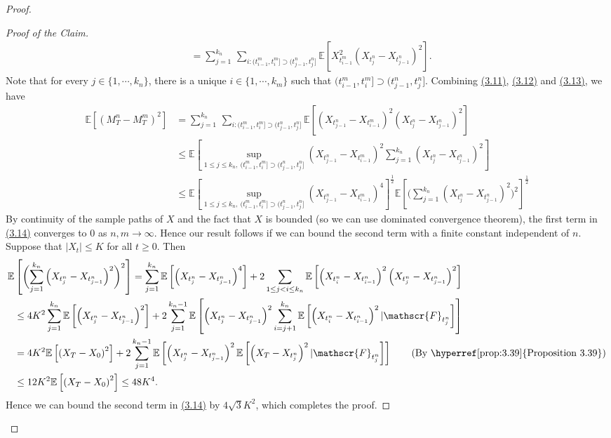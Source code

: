 \documentclass{article}
\numberwithin{equation}{section}
\newcommand{\E}{\mathbb{E}}
\theoremstyle{plain}
\theoremstyle{definition}
\begin{document}
\begin{proof}
\begin{proof}[Proof of the Claim]
\begin{align*}
	&= \sum_{j=1}^{k_n}\,\sum_{i:(t_{i-1}^m,t_i^m]\supset(t_{j-1}^n,t_j^n]}\E\left[X_{t_{i-1}^m}^2\left(X_{t_j^n}-X_{t_{j-1}^n}\right)^2\right].\tag{3.13}\label{eq:3.13}
\end{align*}
Note that for every $j\in\{1,\cdots,k_n\}$, there is a unique $i\in\{1,\cdots,k_m\}$ such that $(t_{i-1}^m,t_i^m]\supset(t_{j-1}^n,t_j^n]$. Combining \hyperref[eq:3.11]{(3.11)}, \hyperref[eq:3.12]{(3.12)} and \hyperref[eq:3.13]{(3.13)}, we have
\begin{align*}
	\E\left[(M_T^n-M_T^m)^2\right] &= \sum_{j=1}^{k_n}\,\sum_{i:(t_{i-1}^m,t_i^m]\supset(t_{j-1}^n,t_j^n]}\E\left[\left(X_{t_{j-1}^n}-X_{t_{i-1}^m}\right)^2\left(X_{t_j^n}-X_{t_{j-1}^n}\right)^2\right]\\
	&\leq \E\left[\sup_{1\leq j\leq k_n,\ (t_{i-1}^m,t_i^m]\supset(t_{j-1}^n,t_j^n]}\left(X_{t_{j-1}^n}-X_{t_{i-1}^m}\right)^2 \sum_{j=1}^{k_n}\left(X_{t_j^n}-X_{t_{j-1}^n}\right)^2\right]\\
	&\leq \E\left[\sup_{1\leq j\leq k_n,\ (t_{i-1}^m,t_i^m]\supset(t_{j-1}^n,t_j^n]}\left(X_{t_{j-1}^n}-X_{t_{i-1}^m}\right)^4\right]^{\frac{1}{2}} \E\left[\biggl(\sum_{j=1}^{k_n}\left(X_{t_j^n}-X_{t_{j-1}^n}\right)^2\biggr)^2\right]^{\frac{1}{2}}\tag{3.14}\label{eq:3.14}
\end{align*}
By continuity of the sample paths of $X$ and the fact that $X$ is bounded (so we can use dominated convergence theorem), the first term in \hyperref[eq:3.14]{(3.14)} converges to $0$ as $n,m\to\infty$. Hence our result follows if we can bound the second term with a finite constant independent of $n$. Suppose that $\vert X_t\vert\leq K$ for all $t\geq 0$. Then
\begin{align*}
\E&\left[\biggl(\sum_{j=1}^{k_n}\left(X_{t_j^n}-X_{t_{j-1}^n}\right)^2\biggr)^2\right] = \sum_{j=1}^{k_n}\E\left[\left(X_{t_j^n}-X_{t_{j-1}^n}\right)^4\right] + 2\sum_{1\leq j < i\leq k_n}\E\left[\left(X_{t_i^n}-X_{t_{i-1}^n}\right)^2\left(X_{t_j^n}-X_{t_{j-1}^n}\right)^2\right]\\
&\leq 4K^2\sum_{j=1}^{k_n}\E\left[\left(X_{t_j^n}-X_{t_{j-1}^n}\right)^2\right] + 2\sum_{j=1}^{k_n-1}\E\left[\left(X_{t_j^n}-X_{t_{j-1}^n}\right)^2\sum_{i=j+1}^{k_n}\E\left[\left(X_{t_i^n}-X_{t_{i-1}^n}\right)^2|\mathscr{F}_{t_j^n}\right]\right]\\
&= 4K^2\E\left[\left(X_T-X_0\right)^2\right] + 2\sum_{j=1}^{k_n-1}\E\left[\left(X_{t_j^n}-X_{t_{j-1}^n}\right)^2\E\left[\left(X_{T}-X_{t_j^n}\right)^2|\mathscr{F}_{t_j^n}\right]\right] \tag{By \hyperref[prop:3.39]{Proposition 3.39}}\\
&\leq 12K^2\E\left[\left(X_T-X_0\right)^2\right]\leq 48K^4.
\end{align*}
Hence we can bound the second term in \hyperref[eq:3.14]{(3.14)} by $4\sqrt{3}K^2$, which completes the proof.
\end{proof}


\end{proof}
\end{document}
